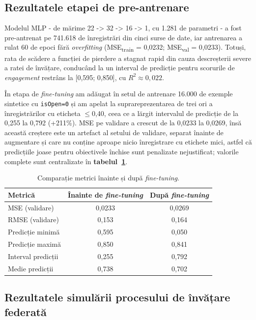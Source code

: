 \documentclass[12pt,a4paper]{report}
\begin{document}
\subsection{Rezultatele etapei de pre-antrenare}

Modelul MLP - de mărime 22 -> 32 -> 16 -> 1, cu 1.281 de parametri - a fost pre-antrenat pe 741.618 de înregistrări din cinci surse de date, iar antrenarea a rulat 60 de epoci fără \textit{overfitting} (MSE\textsubscript{train} = 0,0232; MSE\textsubscript{val} = 0,0233). Totuși, rata de scădere a funcției de pierdere a stagnat rapid din cauza descreșterii severe a ratei de învățare, conducând la un interval de predicție pentru scorurile de \textit{engagement} restrâns la [0,595; 0,850], cu $R^2 \approx 0{,}022$.

În etapa de \textit{fine-tuning} am adăugat în setul de antrenare 16.000 de exemple sintetice cu \texttt{isOpen=0} și am apelat la suprareprezentarea de trei ori a înregistrărilor cu eticheta $\leq$0,40, ceea ce a lărgit intervalul de predicție de la 0,255 la 0,792 (+211\%). MSE pe validare a crescut de la 0,0233 la 0,0269, însă această creștere este un artefact al setului de validare, separat înainte de augmentare și care nu conține aproape nicio înregistrare cu etichete mici, astfel că predicțiile joase pentru obiectivele închise sunt penalizate nejustificat; valorile complete sunt centralizate în \textbf{tabelul~\ref{tab:finetune-comparison}}.

\begin{table}[h]
\centering
\footnotesize
\caption{Comparație metrici înainte și după \textit{fine-tuning}.}
\label{tab:finetune-comparison}
\begin{tabular}{|l|c|c|}
\hline
\textbf{Metrică} & \textbf{Înainte de \textit{fine-tuning}} & \textbf{După \textit{fine-tuning}} \\
\hline
MSE (validare)     & 0,0233 & 0,0269 \\
\hline
RMSE (validare)    & 0,153  & 0,164  \\
\hline
Predicție minimă   & 0,595  & 0,050  \\
\hline
Predicție maximă   & 0,850  & 0,841  \\
\hline
Interval predicții & 0,255  & 0,792  \\
\hline
Medie predicții    & 0,738  & 0,702  \\
\hline
\end{tabular}
\end{table}

\subsection{Rezultatele simulării procesului de învățare federată}
\end{document}
